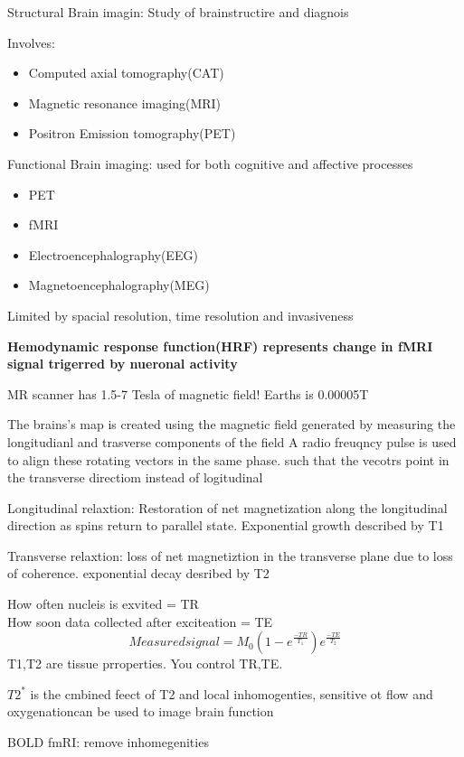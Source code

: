 \documentclass[a4paper]{article}
\begin{document}
Structural Brain imagin: Study of brainstructire and diagnois

Involves:
\begin{itemize}
\item Computed axial tomography(CAT)
\item Magnetic resonance imaging(MRI)
\item Positron Emission tomography(PET)
\end{itemize}

Functional Brain imaging: used for both cognitive and affective processes
\begin{itemize}
\item PET
\item fMRI
\item Electroencephalography(EEG)
\item Magnetoencephalography(MEG)
\end{itemize}

Limited by spacial resolution, time resolution and invasiveness

\bf{Hemodynamic response function(HRF)} represents change in fMRI signal trigerred by nueronal activity

MR scanner has 1.5-7 Tesla of magnetic field! Earths is 0.00005T

The brains's map is created using the magnetic field generated by measuring the longitudianl and trasverse components of the field
A radio freuqncy pulse is used to align these rotating vectors in the same phase. such that
the vecotrs point in the transverse directiom instead of logitudinal

Longitudinal relaxtion: Restoration of net magnetization along the longitudinal direction
as spins return to parallel state. Exponential growth described by T1

Transverse relaxtion: loss of net magnetiztion in the transverse plane due to loss of coherence. exponential decay desribed by T2

How often nucleis is exvited = TR \\
How soon data collected after exciteation = TE\\
\begin{equation}
Measured signal = M_0(1-e^{\frac{-TR}{T_1}})e^{\frac{-TE}{T_2}}
\end{equation}
T1,T2 are tissue prroperties. You control TR,TE.

$T2^{*}$ is the  cmbined feect of T2 and local inhomogenties, sensitive ot flow and oxygenationcan be used to image brain function

BOLD fmRI: remove inhomegenities
\end{document}
